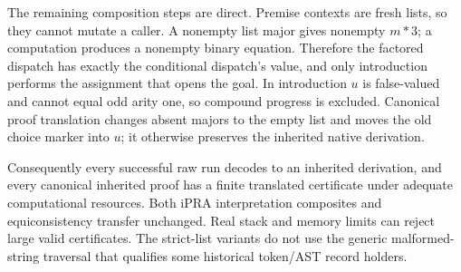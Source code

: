 The remaining composition steps are direct. Premise contexts are fresh
lists, so they cannot mutate a caller. A nonempty list major gives
nonempty $m*3$; a computation produces a nonempty binary equation.
Therefore the factored dispatch has exactly the conditional dispatch's
value, and only introduction performs the assignment that opens the goal.
In introduction $u$ is false-valued and cannot equal odd arity one, so
compound progress is excluded. Canonical proof translation changes absent
majors to the empty list and moves the old choice marker into $u$; it
otherwise preserves the inherited native derivation.

Consequently every successful raw run decodes to an inherited derivation,
and every canonical inherited proof has a finite translated certificate
under adequate computational resources. Both iPRA interpretation
composites and equiconsistency transfer unchanged. Real stack and memory
limits can reject large valid certificates. The strict-list variants do
not use the generic malformed-string traversal that qualifies some
historical token/AST record holders.

